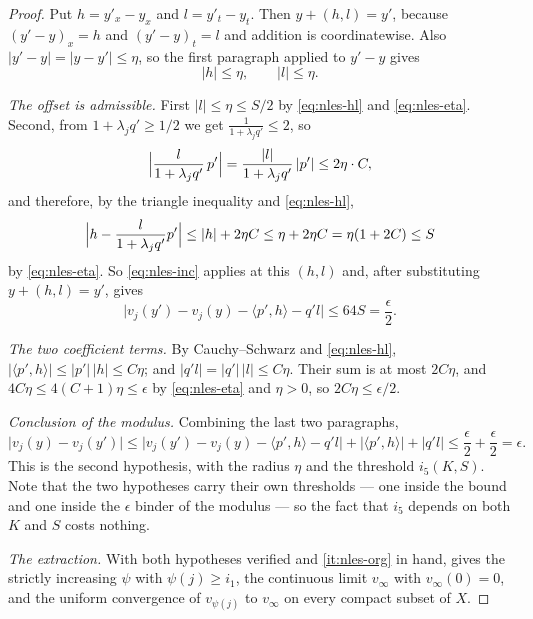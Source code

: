 \begin{proof}
Put $h=y'_x-y_x$ and $l=y'_t-y_t$. Then $y+(h,l)=y'$, because
$(y'-y)_x=h$ and $(y'-y)_t=l$ and addition is coordinatewise. Also
$|y'-y|=|y-y'|\le\eta$, so the first paragraph applied to $y'-y$ gives
\begin{equation}\label{eq:nles-hl}
  |h|\le\eta,\qquad |l|\le\eta .
\end{equation}

\emph{The offset is admissible.} First $|l|\le\eta\le S/2$ by
\eqref{eq:nles-hl} and \eqref{eq:nles-eta}. Second, from
$1+\lambda_jq'\ge1/2$ we get $\frac{1}{1+\lambda_jq'}\le2$, so
\[
  \Bigl|\frac{l}{1+\lambda_jq'}\,p'\Bigr|
   =\frac{|l|}{1+\lambda_jq'}\,|p'|\le2\eta\cdot C ,
\]
and therefore, by the triangle inequality and \eqref{eq:nles-hl},
\[
  \Bigl|h-\frac{l}{1+\lambda_jq'}p'\Bigr|
   \le|h|+2\eta C\le\eta+2\eta C=\eta(1+2C)\le S
\]
by \eqref{eq:nles-eta}. So \eqref{eq:nles-inc} applies at this $(h,l)$ and,
after substituting $y+(h,l)=y'$, gives
\begin{equation}\label{eq:nles-key}
  \bigl|v_j(y')-v_j(y)-\langle p',h\rangle-q'l\bigr|\le64S=\frac\epsilon2 .
\end{equation}

\emph{The two coefficient terms.} By Cauchy--Schwarz and \eqref{eq:nles-hl},
$|\langle p',h\rangle|\le|p'|\,|h|\le C\eta$; and
$|q'l|=|q'|\,|l|\le C\eta$. Their sum is at most $2C\eta$, and
$4C\eta\le4(C+1)\eta\le\epsilon$ by \eqref{eq:nles-eta} and $\eta>0$, so
$2C\eta\le\epsilon/2$.

\emph{Conclusion of the modulus.} Combining the last two paragraphs,
\[
  \bigl|v_j(y)-v_j(y')\bigr|
   \le\bigl|v_j(y')-v_j(y)-\langle p',h\rangle-q'l\bigr|
     +|\langle p',h\rangle|+|q'l|
   \le\frac\epsilon2+\frac\epsilon2=\epsilon .
\]
This is the second hypothesis, with the radius $\eta$ and the threshold
$i_5(K,S)$. Note that the two hypotheses carry their own thresholds --- one
inside the bound and one inside the $\epsilon$ binder of the modulus --- so the
fact that $i_5$ depends on both $K$ and $S$ costs nothing.

\emph{The extraction.} With both hypotheses verified and
\ref{it:nles-org} in hand,  gives
the strictly increasing $\psi$ with $\psi(j)\ge i_1$, the continuous limit
$v_\infty$ with $v_\infty(0)=0$, and the uniform convergence of
$v_{\psi(j)}$ to $v_\infty$ on every compact subset of $X$.
\end{proof}
